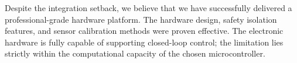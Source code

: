 \documentclass[11pt]{article}
\begin{document}
Despite the integration setback, we believe that we have successfully delivered a professional-grade hardware platform. The hardware design, safety isolation features, and sensor calibration methods were proven effective. The electronic hardware is fully capable of supporting closed-loop control; the limitation lies strictly within the computational capacity of the chosen microcontroller.
\end{document}
